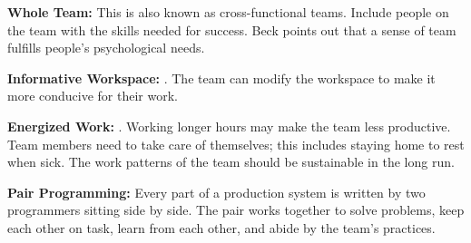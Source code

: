 

\textbf{Whole Team:} This is also known as cross-functional teams. Include people on the team with the skills needed for success. Beck points out that a sense of team fulfills people's psychological needs.  \cite{BeckExtremeProgramming2004}
 




\textbf{Informative Workspace:}  \cite{BeckExtremeProgramming2004}. The team can modify the workspace to make it more conducive for their work. 




\textbf{Energized Work:}  \cite{BeckExtremeProgramming2004}. Working longer hours may make the team less productive. Team members need to take care of themselves; this includes staying home to rest when sick. The work patterns of the team should be sustainable in the long run.


\textbf{Pair Programming:} Every part of a production system is written by two programmers sitting side by side. The pair works together to solve problems, keep each other on task, learn from each other, and abide by the team's practices.




